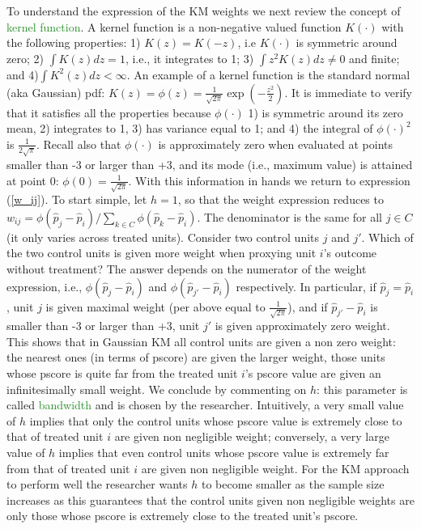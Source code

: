 {To understand the expression of the KM weights we next review the concept of \textcolor{ForestGreen}{kernel function}. A kernel function is a non-negative valued function $K(\cdot)$ with the following properties: 1) $K\left( z \right) = K\left( -z \right)$, i.e $K\left(\cdot \right) $ is symmetric around zero; 2) $\int K\left( z \right) dz =1$, i.e., it integrates to 1; 3) $\int z ^{2}K\left(z \right) dz \not=0$ and finite; and 4)$\int K^{2}\left( z \right) dz <\infty $. An example of a kernel function is the standard normal (aka Gaussian) pdf: $K\left( z\right) =\phi(z)=\frac{1}{\sqrt{2\pi }}\exp \left( -\frac{z^{2}}{2}\right)$. It is immediate to verify that it satisfies all the properties because $\phi(\cdot)$ 1) is symmetric around its zero mean, 2) integrates to 1, 3) has variance equal to 1; and 4) the integral of $\phi(\cdot)^2$ is $\frac{1}{2\sqrt{\pi}}$. Recall also that $\phi(\cdot)$ is approximately zero when evaluated at points smaller than -3 or larger than +3, and its mode (i.e., maximum value) is attained at point 0: $\phi(0)=\frac{1}{\sqrt{2\pi}}$. With this information in hands we return to expression (\ref{w_ij}). To start simple, let $h=1$, so that the weight expression reduces to $w_{ij}=\phi \left(\widehat{p}_{j}-\widehat{p}_{i}\right)/\sum_{k \in C}\phi \left( \widehat{p}_{k}-\widehat{p}_{i}\right)$. The denominator is the same for all $j \in C$ (it only varies across treated units). Consider two control units $j$ and $j'$. Which of the two control units is given more weight when proxying unit $i$'s outcome without treatment? The answer depends on the numerator of the weight expression, i.e.,  $\phi \left(\widehat{p}_{j}-\widehat{p}_{i}\right)$ and $\phi \left(\widehat{p}_{j'}-\widehat{p}_{i}\right)$ respectively. In particular, if $\widehat{p}_{j}=\widehat{p}_{i}$, unit $j$ is given maximal weight (per above equal to $\frac{1}{\sqrt{2\pi}}$), and if $\widehat{p}_{j'}-\widehat{p}_{i}$ is smaller than -3 or larger than +3, unit $j'$ is given approximately zero weight. This shows that in Gaussian KM all control units are given a non zero weight: the nearest ones (in terms of pscore) are given the larger weight, those units whose pscore is quite far from the treated unit $i$'s pscore value are given an infinitesimally small weight. We conclude by commenting on $h$: this parameter is called \textcolor{ForestGreen}{bandwidth} and is chosen by the researcher. Intuitively, a very small value of $h$ implies that only the control units whose pscore value is extremely close to that of treated unit $i$ are given non negligible weight; conversely, a very large value of $h$ implies that even control units whose pscore value is extremely far from that of treated unit $i$ are given non negligible weight. For the KM approach to perform well the researcher wants $h$ to become smaller as the sample size increases as this guarantees that the control units given non negligible weights are only those whose pscore is extremely close to the treated unit's pscore.
}
